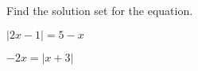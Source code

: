 \begin{exercise}
	Find the solution set for the equation. %

	\noindent
	\begin{enumerate*}[label=\textup{(\arabic*)~}]
		\item  $|2x-1|=5-x$
		\item  $-2x=|x+3|$ \hfill\null
	\end{enumerate*}
\end{exercise}

\vfill
\begin{center}\hfill
\end{center}


